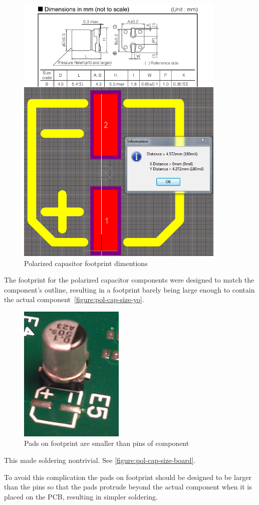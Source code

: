 \begin{figure}
\begin{center}
\includegraphics[width=10cm,keepaspectratio]{pcb/pol_cap_size_footprint_vs_specs.png}
\caption{Polarized capasitor footprint dimentions}
\label{figure:pol-cap-size-yo}
\end{center}
\end{figure}

The footprint for the polarized capacitor components were designed to match the component's outline, resulting in a footprint barely being large enough to contain the actual component~\vref{figure:pol-cap-size-yo}.

\begin{figure}
\begin{center}
\includegraphics[width=5cm,keepaspectratio]{pcb/pol_cap_size_on_board.png}
\caption{Pads on footprint are smaller than pins of component}
\label{figure:pol-cap-size-board}
\end{center}
\end{figure}

This made soldering nontrivial.
See \vref{figure:pol-cap-size-board}.

To avoid this complication the pads on footprint should be designed to be larger than the pins so that the pads protrude beyond the actual component when it is placed on the PCB, resulting in simpler soldering.
